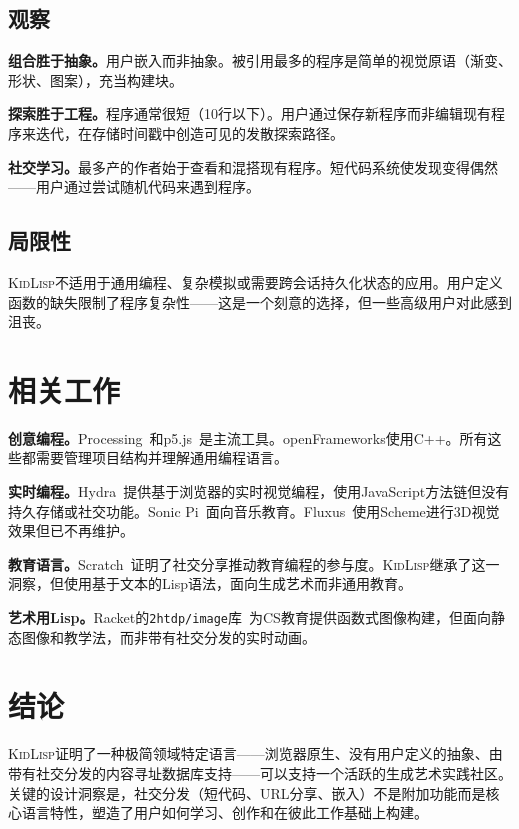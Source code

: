 \documentclass[10pt,letterpaper,twocolumn]{article}
\newcommand{\kidlisp}{\textsc{KidLisp}}
\begin{document}
\subsection{观察}

\textbf{组合胜于抽象。}用户嵌入而非抽象。被引用最多的程序是简单的视觉原语（渐变、形状、图案），充当构建块。

\textbf{探索胜于工程。}程序通常很短（10行以下）。用户通过保存新程序而非编辑现有程序来迭代，在存储时间戳中创造可见的发散探索路径。

\textbf{社交学习。}最多产的作者始于查看和混搭现有程序。短代码系统使发现变得偶然——用户通过尝试随机代码来遇到程序。

\subsection{局限性}

\kidlisp{}不适用于通用编程、复杂模拟或需要跨会话持久化状态的应用。用户定义函数的缺失限制了程序复杂性——这是一个刻意的选择，但一些高级用户对此感到沮丧。

\section{相关工作}

\textbf{创意编程。}Processing~\citep{reas2007processing}和p5.js~\citep{mccarthy2015p5js}是主流工具。openFrameworks使用C++。所有这些都需要管理项目结构并理解通用编程语言。

\textbf{实时编程。}Hydra~\citep{hydra2019}提供基于浏览器的实时视觉编程，使用JavaScript方法链但没有持久存储或社交功能。Sonic Pi~\citep{aaron2016sonic}面向音乐教育。Fluxus~\citep{fluxus2007}使用Scheme进行3D视觉效果但已不再维护。

\textbf{教育语言。}Scratch~\citep{resnick2009scratch}证明了社交分享推动教育编程的参与度。\kidlisp{}继承了这一洞察，但使用基于文本的Lisp语法，面向生成艺术而非通用教育。

\textbf{艺术用Lisp。}Racket的\texttt{2htdp/image}库~\citep{racket2018}为CS教育提供函数式图像构建，但面向静态图像和教学法，而非带有社交分发的实时动画。

\section{结论}

\kidlisp{}证明了一种极简领域特定语言——浏览器原生、没有用户定义的抽象、由带有社交分发的内容寻址数据库支持——可以支持一个活跃的生成艺术实践社区。关键的设计洞察是，社交分发（短代码、URL分享、嵌入）不是附加功能而是核心语言特性，塑造了用户如何学习、创作和在彼此工作基础上构建。
\end{document}
